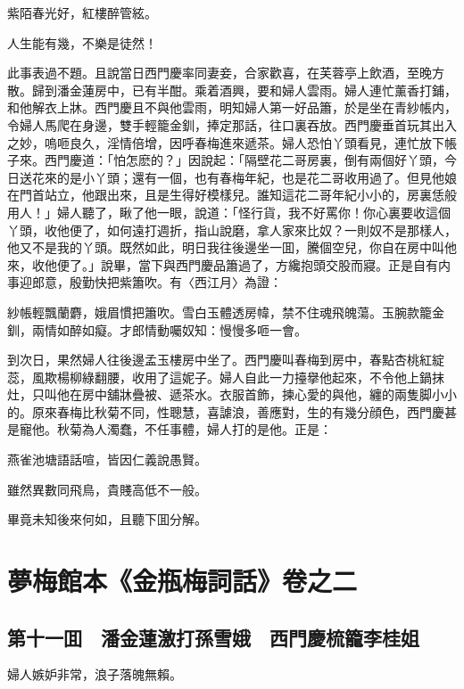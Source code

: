 紫陌春光好，紅樓醉管絃。

人生能有幾，不樂是徒然！

此事表過不題。且說當日西門慶率同妻妾，合家歡喜，在芙蓉亭上飲酒，至晚方散。歸到潘金蓮房中，已有半酣。乘着酒興，要和婦人雲雨。婦人連忙薰香打鋪，和他解衣上牀。西門慶且不與他雲雨，明知婦人第一好品簫，於是坐在青紗帳内，令婦人馬爬在身邊，雙手輕籠金釧，捧定那話，往口裏吞放。西門慶垂首玩其出入之妙，嗚咂良久，淫情倍增，因呼春梅進來遞茶。婦人恐怕丫頭看見，連忙放下帳子來。西門慶道：「怕怎麽的？」因說起：「隔壁花二哥房裏，倒有兩個好丫頭，今日送花來的是小丫頭；還有一個，也有春梅年紀，也是花二哥收用過了。但見他娘在門首站立，他跟出來，且是生得好模樣兒。誰知這花二哥年紀小小的，房裏恁般用人！」婦人聽了，瞅了他一眼，說道：「怪行貨，我不好罵你！你心裏要收這個丫頭，收他便了，如何遠打週折，指山說磨，拿人家來比奴？一則奴不是那樣人，他又不是我的丫頭。既然如此，明日我往後邊坐一囬，騰個空兒，你自在房中叫他來，收他便了。」說畢，當下與西門慶品簫過了，方纔抱頭交股而寢。正是自有内事迎郎意，殷勤快把紫簫吹。有〈西江月〉為證：

紗帳輕飄蘭麝，娥眉慣把簫吹。雪白玉體透房幃，禁不住魂飛魄蕩。玉腕款籠金釧，兩情如醉如癡。才郎情動囑奴知：慢慢多咂一會。

到次日，果然婦人往後邊孟玉樓房中坐了。西門慶叫春梅到房中，春點杏桃紅綻蕊，風欺楊柳綠翻腰，收用了這妮子。婦人自此一力擡擧他起來，不令他上鍋抹灶，只叫他在房中舖牀疊被、遞茶水。衣服首飾，揀心愛的與他，纏的兩隻脚小小的。原來春梅比秋菊不同，性聰慧，喜謔浪，善應對，生的有幾分顔色，西門慶甚是寵他。秋菊為人濁蠢，不任事體，婦人打的是他。正是：

燕雀池塘語話喧，皆因仁義說愚賢。

雖然異數同飛鳥，貴賤高低不一般。

畢竟未知後來何如，且聽下囬分解。

\part*{夢梅館本《金瓶梅詞話》卷之二}

\chapter*{第十一囬　潘金蓮激打孫雪娥　西門慶梳籠李桂姐}

婦人嫉妒非常，浪子落魄無賴。


